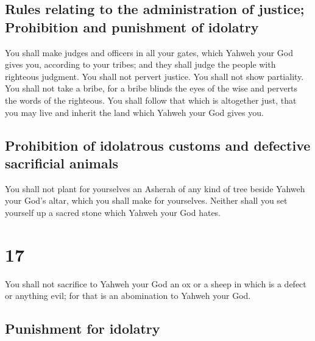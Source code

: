 \hypertarget{rules-relating-to-the-administration-of-justice-prohibition-and-punishment-of-idolatry}{%
\subsection{Rules relating to the administration of justice; Prohibition
and punishment of
idolatry}\label{rules-relating-to-the-administration-of-justice-prohibition-and-punishment-of-idolatry}}

 You shall make judges and officers in all your gates,
which Yahweh your God gives you, according to your tribes; and they
shall judge the people with righteous judgment.  You
shall not pervert justice. You shall not show partiality. You shall not
take a bribe, for a bribe blinds the eyes of the wise and perverts the
words of the righteous.  You shall follow that which is
altogether just, that you may live and inherit the land which Yahweh
your God gives you.

\hypertarget{prohibition-of-idolatrous-customs-and-defective-sacrificial-animals}{%
\subsection{Prohibition of idolatrous customs and defective sacrificial
animals}\label{prohibition-of-idolatrous-customs-and-defective-sacrificial-animals}}

 You shall not plant for yourselves an Asherah of any
kind of tree beside Yahweh your God's altar, which you shall make for
yourselves.  Neither shall you set yourself up a sacred
stone which Yahweh your God hates.

\hypertarget{section-16}{%
\section{17}\label{section-16}}

 You shall not sacrifice to Yahweh your God an ox or a
sheep in which is a defect or anything evil; for that is an abomination
to Yahweh your God.

\hypertarget{punishment-for-idolatry}{%
\subsection{Punishment for idolatry}\label{punishment-for-idolatry}}

